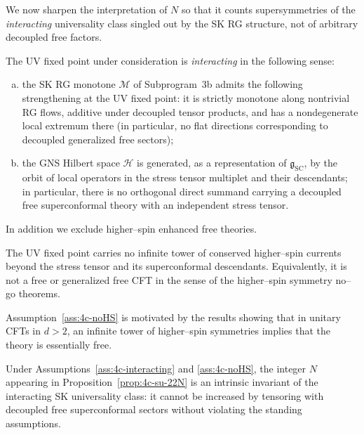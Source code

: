 We now sharpen the interpretation of \(N\) so that it counts
supersymmetries of the \emph{interacting} universality class singled out
by the SK RG structure, not of arbitrary decoupled free factors.

\begin{assumption}
\label{ass:4c-interacting}
The UV fixed point under consideration is \emph{interacting} in the
following sense:
\begin{enumerate}[(a)]
  \item the SK RG monotone \(\mathcal M\) of Subprogram~3b admits the
        following strengthening at the UV fixed point: it is strictly
        monotone along nontrivial RG flows, additive under decoupled
        tensor products, and has a nondegenerate local extremum there
        (in particular, no flat directions corresponding to decoupled
        generalized free sectors);

  \item the GNS Hilbert space \(\mathcal H\) is generated, as a
        representation of \(\mathfrak g_{\mathrm{SC}}\), by the orbit
        of local operators in the stress tensor multiplet and their
        descendants; in particular, there is no orthogonal direct
        summand carrying a decoupled free superconformal theory with an
        independent stress tensor.

\end{enumerate}
\end{assumption}

In addition we exclude higher–spin enhanced free theories.

\begin{assumption}
\label{ass:4c-noHS}
The UV fixed point carries no infinite tower of conserved higher–spin
currents beyond the stress tensor and its superconformal descendants.
Equivalently, it is not a free or generalized free CFT in the sense of
the higher–spin symmetry no–go theorems.
\end{assumption}

Assumption~\ref{ass:4c-noHS} is motivated by the results showing that
in unitary CFTs in \(d>2\), an infinite tower of higher–spin symmetries
implies that the theory is essentially free.

\begin{lemma}
\label{lem:4c-N-intrinsic}
Under Assumptions~\ref{ass:4c-interacting} and
\ref{ass:4c-noHS}, the integer \(N\) appearing in
Proposition~\ref{prop:4c-su-22N} is an intrinsic invariant of the
interacting SK universality class: it cannot be increased by tensoring
with decoupled free superconformal sectors without violating the
standing assumptions.
\end{lemma}

